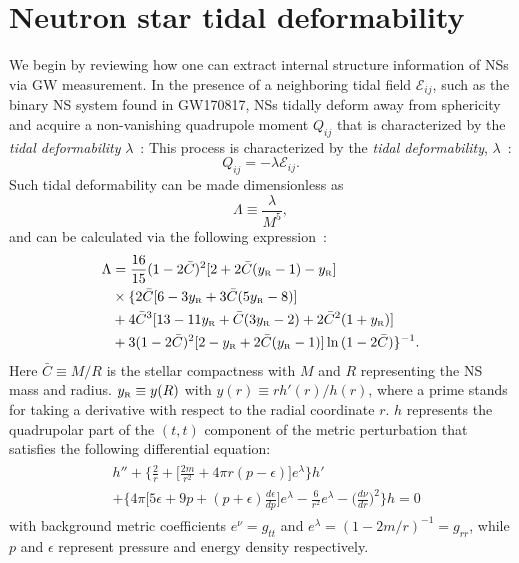 \documentclass[prd,twocolumn,nofootinbib,superscriptaddress,amsmath,amssymb]{revtex4-1}
\begin{document}
\section{Neutron star tidal deformability}\label{sec:tidal}
We begin by reviewing how one can extract internal structure information of NSs via GW measurement.
In the presence of a neighboring tidal field $\mathcal{E}_{ij}$, such as the binary NS system found in GW170817, NSs tidally deform away from sphericity and acquire a non-vanishing quadrupole moment $Q_{ij}$ that is characterized by the \textit{tidal deformability} $\lambda$~\cite{Flanagan2008}:
This process is characterized by the \textit{tidal deformability}, $\lambda$~\cite{hinderer-love,Yagi2013}:
\begin{equation}
Q_{ij} = - \lambda \mathcal{E}_{ij}.
\end{equation}
Such tidal deformability can be made dimensionless as
\begin{equation}
\Lambda \equiv \frac{\lambda}{M^5},
\end{equation}
and can be calculated via the following expression~\cite{hinderer-love,damour-nagar,Yagi2013}:
\begin{align}
\begin{split}
\Lambda &= \frac{16}{15} (1-2\bar{C})^2[2+2\bar{C}(y_{\mbox{\tiny R}}-1)-y_{\mbox{\tiny R}}]\\
& \times \{2\bar{C}[6-3y_{\mbox{\tiny R}}+3\bar{C}(5y_{\mbox{\tiny R}}-8)]\\ 
&+4\bar{C}^3[13-11y_{\mbox{\tiny R}}+\bar{C}(3y_{\mbox{\tiny R}}-2)+2\bar{C}^2(1+y_{\mbox{\tiny R}})]\\ 
&+3(1-2\bar{C})^2[2-y_{\mbox{\tiny R}}+2\bar{C}(y_{\mbox{\tiny R}}-1)]\ln{(1-2\bar{C})}\}^{-1}.
\end{split}
\end{align}
Here $\bar{C} \equiv M / R$ is the stellar compactness with $M$ and $R$ representing the NS mass and radius. $y_{\mbox{\tiny R}} \equiv y(R)$ with $y(r) \equiv r h'(r)/h(r)$, where a prime stands for taking a derivative with respect to the radial coordinate $r$. $h$ represents the quadrupolar part of the $(t,t)$ component of the metric perturbation that satisfies the following differential equation:
\begin{align}\label{eq:deq} 
\begin{split}
& h''+ \Big\{ \frac{2}{r} + \Big\lbrack \frac{2m}{r^2}+4 \pi r (p - \epsilon ) \Big\rbrack e^{\lambda} \Big\} h'\\
&+ \Big\{4 \pi \Big\lbrack 5 \epsilon + 9p + (p+ \epsilon) \frac{d \epsilon}{dp} \Big\rbrack e^{\lambda}- \frac{6}{r^2}e^{\lambda} - \Big(\frac{d \nu}{dr} \Big)^2 \Big\}h =0
\end{split}
\end{align}
with background metric coefficients $e^{\nu} = g_{tt}$ and $e^{\lambda} = (1-2m/r)^{-1} = g_{rr}$, while $p$ and $\epsilon$ represent pressure and energy density respectively.
\end{document}
